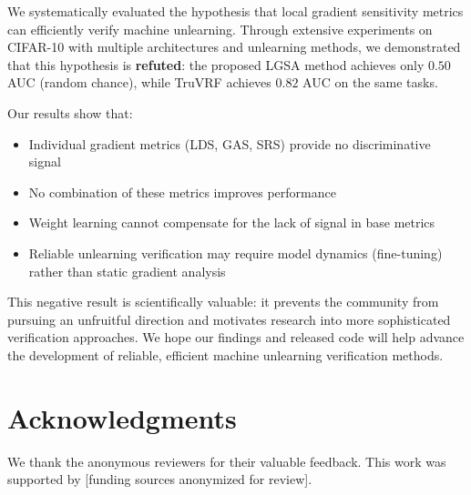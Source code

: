 \documentclass{article}
\begin{document}
We systematically evaluated the hypothesis that local gradient sensitivity metrics can efficiently verify machine unlearning. Through extensive experiments on CIFAR-10 with multiple architectures and unlearning methods, we demonstrated that this hypothesis is \textbf{refuted}: the proposed LGSA method achieves only $0.50$ AUC (random chance), while TruVRF achieves $0.82$ AUC on the same tasks.

Our results show that:
\begin{itemize}
    \item Individual gradient metrics (LDS, GAS, SRS) provide no discriminative signal
    \item No combination of these metrics improves performance
    \item Weight learning cannot compensate for the lack of signal in base metrics
    \item Reliable unlearning verification may require model dynamics (fine-tuning) rather than static gradient analysis
\end{itemize}

This negative result is scientifically valuable: it prevents the community from pursuing an unfruitful direction and motivates research into more sophisticated verification approaches. We hope our findings and released code will help advance the development of reliable, efficient machine unlearning verification methods.

\section*{Acknowledgments}

We thank the anonymous reviewers for their valuable feedback. This work was supported by [funding sources anonymized for review].
\end{document}
